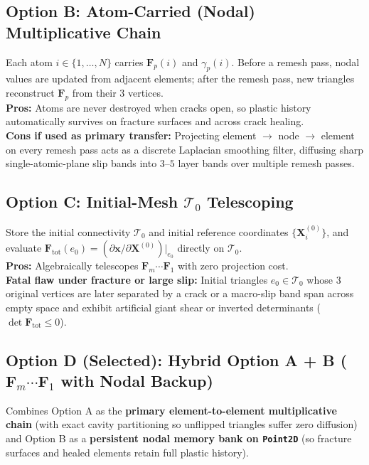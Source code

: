 \documentclass[11pt,a4paper]{article}
\newcommand{\code}[1]{\texttt{#1}}
\begin{document}
\subsection{Option B: Atom-Carried (Nodal) Multiplicative Chain}

Each atom $i \in \{1, \dots, N\}$ carries $\mathbf{F}_p(i)$ and $\gamma_p(i)$. Before a remesh pass, nodal values are updated from adjacent elements; after the remesh pass, new triangles reconstruct $\mathbf{F}_p$ from their 3 vertices. \\
\textbf{Pros:} Atoms are never destroyed when cracks open, so plastic history automatically survives on fracture surfaces and across crack healing. \\
\textbf{Cons if used as primary transfer:} Projecting element $\to$ node $\to$ element on every remesh pass acts as a discrete Laplacian smoothing filter, diffusing sharp single-atomic-plane slip bands into $3$--$5$ layer bands over multiple remesh passes.

\subsection{Option C: Initial-Mesh $\mathcal{T}_0$ Telescoping}

Store the initial connectivity $\mathcal{T}_0$ and initial reference coordinates $\{\mathbf{X}_i^{(0)}\}$, and evaluate $\mathbf{F}_{\text{tot}}(e_0) = (\partial \mathbf{x} / \partial \mathbf{X}^{(0)})\big|_{e_0}$ directly on $\mathcal{T}_0$. \\
\textbf{Pros:} Algebraically telescopes $\mathbf{F}_m \cdots \mathbf{F}_1$ with zero projection cost. \\
\textbf{Fatal flaw under fracture or large slip:} Initial triangles $e_0 \in \mathcal{T}_0$ whose 3 original vertices are later separated by a crack or a macro-slip band span across empty space and exhibit artificial giant shear or inverted determinants ($\det \mathbf{F}_{\text{tot}} \le 0$).

\subsection{Option D (Selected): Hybrid Option A + B ($\mathbf{F}_m \cdots \mathbf{F}_1$ with Nodal Backup)}

Combines Option A as the \textbf{primary element-to-element multiplicative chain} (with exact cavity partitioning so unflipped triangles suffer zero diffusion) and Option B as a \textbf{persistent nodal memory bank on \code{Point2D}} (so fracture surfaces and healed elements retain full plastic history).
\end{document}
